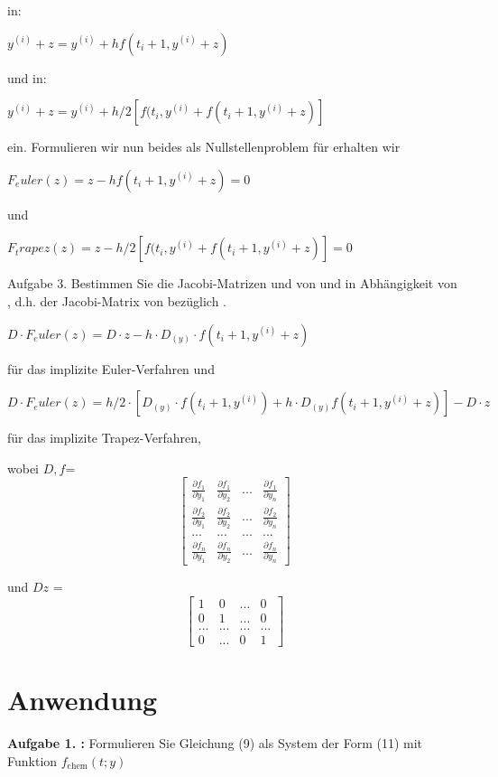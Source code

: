in:

$ y^(i) + z = y^(i) + hf(t_i+1,y^(i) + z) $

und in:

$ y^(i) + z = y^(i) + h/2 [f(t_i, y^(i) + f(t_i+1,y^(i) + z)] $

ein. Formulieren wir nun beides als Nullstellenproblem für  erhalten wir

$ F_euler(z) = z - hf(t_i+1, y^(i) + z) = 0 $

und 

$F_trapez(z) =  z - h/2 [f(t_i, y^(i) + f(t_i+1,y^(i) + z)] = 0$

Aufgabe 3.
Bestimmen Sie die Jacobi-Matrizen  und  von  und  in Abhängigkeit von , d.h. der Jacobi-Matrix von  bezüglich .

$ D\cdot F_euler(z) = D\cdot z - h\cdot D_(y)\cdot f(t_i+1, y^(i) + z) $

für das implizite Euler-Verfahren und

$ D\cdot F_euler(z) = h/2\cdot [D_(y)\cdot f(t_i+1, y^(i)) +  h\cdot D_(y)f(t_i+1, y^(i) + z)] - D\cdot z $

für das implizite Trapez-Verfahren,

wobei $D, f $=
\begin{equation}
\begin{bmatrix}
	\frac{\partial f_1 }{\partial y_1} & \frac{\partial f_1 }{\partial y_2} & ... & \frac{\partial f_1 }{\partial y_n} \\
	\frac{\partial f_2 }{\partial y_1} & \frac{\partial f_2 }{\partial y_2} & ... & \frac{\partial f_2 }{\partial y_n} \\
	... & ... & ... & ... \\
	\frac{\partial f_n }{\partial y_1} & \frac{\partial f_n }{\partial y_2} & ... & \frac{\partial f_n }{\partial y_n} 
\end{bmatrix} 
\end{equation}


und $Dz$ =
\begin{equation}
\begin{bmatrix}
	1 & 0 & ... & 0 \\
	0 & 1 & ... & 0 \\
	... & ... & ... & ... \\
	0 & ... & 0 & 1 
\end{bmatrix}  
\end{equation}



\section{Anwendung}
\begin{mybox}
	\textbf{Aufgabe 1. :} Formulieren Sie Gleichung (9) als System der Form (11) mit Funktion $f_{\mathrm{chem}}(t; y)$
\end{mybox}


